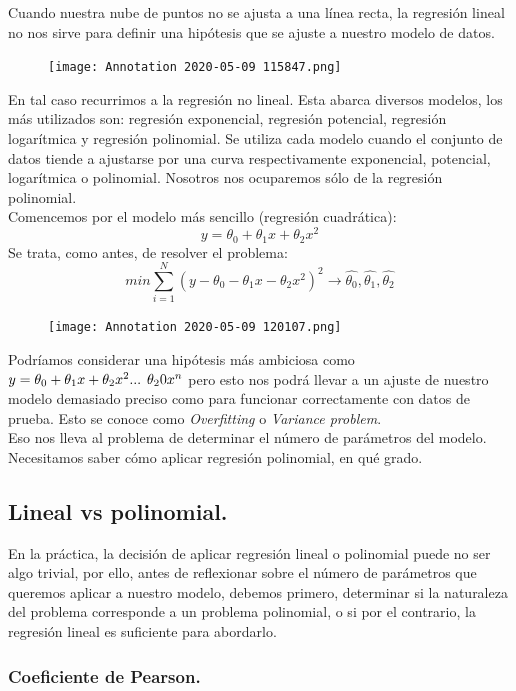 \documentclass[a4paper,10pt]{article}
\begin{document}
Cuando nuestra nube de puntos no se ajusta a una línea recta, la regresión lineal no nos sirve para definir una hipótesis que se ajuste a nuestro modelo de datos.
\begin{figure}[H]
\centering
\texttt{[image: Annotation 2020-05-09 115847.png]}
\end{figure}
En tal caso recurrimos a la regresión no lineal. Esta abarca diversos modelos, los más utilizados son: regresión exponencial, regresión potencial, regresión logarítmica y regresión polinomial. Se utiliza cada modelo cuando el conjunto de
datos tiende a ajustarse por una curva respectivamente exponencial, potencial,
logarítmica o polinomial. Nosotros nos ocuparemos sólo de la regresión polinomial.\\
Comencemos por el modelo más sencillo (regresión cuadrática):
\[
 y=\theta_0+\theta_1 x+\theta_2 x^2
\]
Se trata, como antes, de resolver el problema:
\[
 min\sum_{i=1}^{N}(y-\theta_0-\theta_1 x-\theta_2 x^2)^2\longrightarrow \hat{\theta_0},\hat{\theta_1},\hat{\theta_2}
\] 
\begin{figure}[H]
\centering
\texttt{[image: Annotation 2020-05-09 120107.png]}
\end{figure}
Podríamos considerar una hipótesis más ambiciosa como $y=\theta_0+\theta_1 x+\theta_2 x^2 ...\hspace{0.15cm} \theta_20 x^n$ pero esto nos podrá llevar a un ajuste de nuestro modelo demasiado preciso como para funcionar correctamente con datos de prueba. Esto se conoce como \textit{Overfitting} o \textit{Variance problem}.
\\Eso nos lleva al problema de determinar el número de parámetros del modelo. Necesitamos saber cómo aplicar regresión polinomial, en qué grado.
\subsection{Lineal vs polinomial.}

En la práctica, la decisión de aplicar regresión lineal o polinomial puede no ser algo trivial, por ello, antes de reflexionar sobre el número de parámetros que queremos aplicar a nuestro modelo, debemos primero, determinar si la naturaleza del problema corresponde a un problema polinomial, o si por el contrario, la regresión lineal es suficiente para abordarlo.
\subsubsection{Coeficiente de Pearson.}
\end{document}

